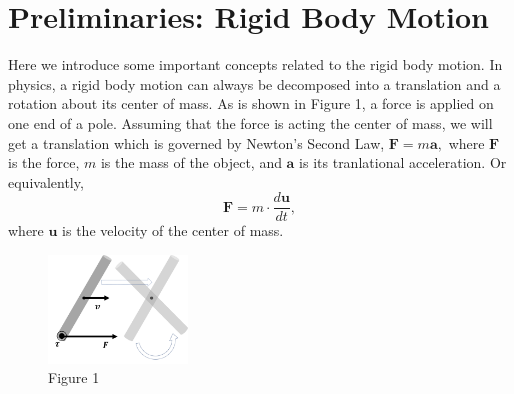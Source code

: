 \documentclass[12pt]{article}
\renewcommand{\(}{\left (}
\renewcommand{\)}{\right )}
\renewcommand{\vec}[1]{\boldsymbol{#1}}
\begin{document}
\section{Preliminaries: Rigid Body Motion}
\hspace{5mm} Here we introduce some important concepts related to the rigid body motion. In physics, a rigid body motion can always be decomposed into a translation and a rotation about its center of mass. As is shown in Figure 1, a force is applied on one end of a pole. Assuming that the force is acting the center of mass, we will get a translation which is governed by Newton's Second Law, $\vec{F} = m\vec{a},$ where $\vec{F}$ is the force, $m$ is the mass of the object, and $\vec{a}$ is its tranlational acceleration. Or equivalently,
\begin{equation}
{\vec{F}} = m \cdot \frac{d\vec{u}}{dt},
\end{equation} where $\vec{u}$ is the velocity of the center of mass.
\\
\begin{figure}[ht]

		\centering
		\includegraphics[width=0.33\textwidth]{prelim_demo.png}
		\caption*{\small Figure 1}

\end{figure}
\end{document}
